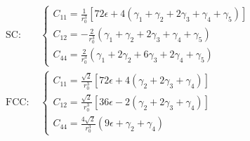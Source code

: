 \documentclass[preview]{standalone}
\begin{document}
\begin{align*}
\text{SC: } &
            \begin{cases}
            C_{11}=\frac{1}{r_0^3}\left[72 \epsilon + 4(\gamma_{1}+\gamma_{2}+2\gamma_{3}+\gamma_{4}+\gamma_{5})\right] \\[0.4cm]
            C_{12}=-\frac{2}{r_{0}^3}(\gamma_{1}+\gamma_{2}+2\gamma_{3}+\gamma_{4}+\gamma_{5}) \\[0.4cm]
            C_{44}=\frac{2}{r_{0}^3}\left(\gamma_{1}+2\gamma_{2}+6\gamma_{3}+2\gamma_{4}+\gamma_{5}\right)
            \end{cases}
            \\[1cm]
            \text{FCC: } &
            \begin{cases}
            C_{11}=\frac{\sqrt{2}}{r_{0}^3}\left[72 \epsilon + 4(\gamma_{2}+2\gamma_{3}+\gamma_{4})\right] \\[0.4cm]
            C_{12}=\frac{\sqrt{2}}{r_{0}^3}\left[36 \epsilon - 2(\gamma_{2}+2\gamma_{3}+\gamma_{4})\right] \\[0.4cm]
            C_{44}=\frac{4\sqrt2}{r_{0}^3}\left(9\epsilon +\gamma_{2}+\gamma_{4}\right)
            \end{cases}
\end{align*}
\end{document}
